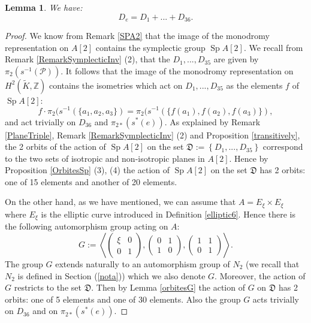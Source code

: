 \documentclass{alggeom}
\DeclareMathOperator{\Sp}{Sp}
\newcommand{\Z}{\mathbb{Z}}
\theoremstyle{plain}
\newtheorem{lemme}[theorem]{Lemma}
\theoremstyle{definition}
\theoremstyle{remark}
\begin{document}
\begin{lemme}\label{Ddelta}
We have:
$$D_e=D_1+...+D_{36}.$$
\end{lemme}
\begin{proof}
We know from Remark \ref{SPA2} that the image of the monodromy representation on $A[2]$ contains the symplectic group $\Sp A[2]$. 
We recall from Remark \ref{RemarkSymplecticInv} (2), that the $D_1,...,D_{35}$ are given by $\pi_2(s^{-1}(\mathcal{P}))$.
It follows that the image of the monodromy representation on $H^2(\widetilde{K},\Z)$ contains the isometries which act on $D_1,...,D_{35}$
as the elements $f$ of $\Sp A[2]$:
$$f\cdot \pi_2(s^{-1}(\{a_1,a_2,a_3\})=\pi_2(s^{-1}(\{f(a_1),f(a_2),f(a_3)\}),$$
and act trivially on $D_{36}$ and $\pi_{2*}(s^{*}(e))$. 
As explained by Remark \ref{PlaneTriple}, Remark \ref{RemarkSymplecticInv} (2) and Proposition \ref{transitively}, the 2 orbits of the action of $\Sp A[2]$ on the set $\mathfrak{D}:=\left\{D_1,...,D_{35}\right\}$ correspond to the two sets of isotropic and non-isotropic planes in $A[2]$. Hence by Proposition \ref{OrbitesSp} (3), (4)  the action of $\Sp A[2]$ on the set $\mathfrak{D}$ has 2 orbits: one of 15 elements and another of 20 elements. 

On the other hand, as we have mentioned, we can assume that $A=E_\xi\times E_\xi$ where $E_\xi$ is the elliptic curve introduced in Definition \ref{elliptic6}. Hence there is the following automorphism group acting on $A$:
$$G:=\left\langle \left(
\begin{array}{cc}
\xi & 0\\
0 & 1 
\end{array} \right), 
\left(
\begin{array}{cc}
0 & 1\\
1 & 0 
\end{array} \right),
\left(
\begin{array}{cc}
1 & 1\\
0 & 1 
\end{array} \right)
 \right\rangle.$$
The group $G$ extends naturally to an automorphism group of $N_2$ (we recall that $N_2$ is defined in Section (\ref{nota})) 
which we also denote $G$.  Moreover, the action of $G$ restricts to the set $\mathfrak{D}$. Then by Lemma \ref{orbitesG} the action of $G$ on $\mathfrak{D}$ has 2 orbits: one of 5 elements and one of 30 elements. Also the group $G$ acts trivially on $D_{36}$ and on $\pi_{2*}(s^{*}(e))$. 


\end{proof}
\end{document}

